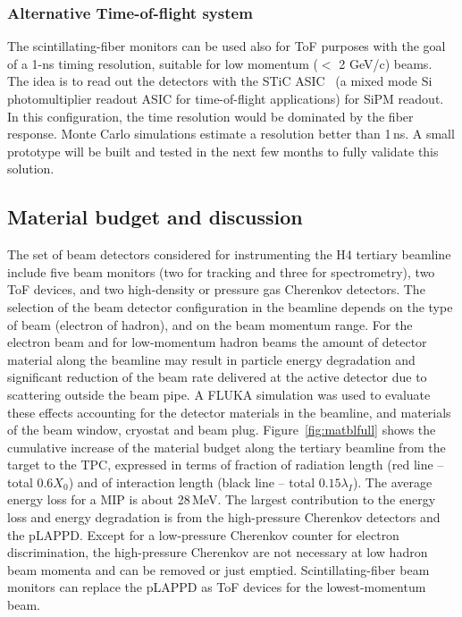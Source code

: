 \subsubsection{Alternative Time-of-flight system}
The  scintillating-fiber monitors can be used also for ToF purposes with the goal of a 1-ns timing resolution, suitable for low momentum ($<$ 2 GeV/c) beams. 
The idea is to read out the detectors with the STiC ASIC~\cite{STIC} (a mixed mode Si photomultiplier readout ASIC for time-of-flight applications) for SiPM readout. 
In this configuration, the time resolution would be dominated by the fiber response. Monte Carlo simulations estimate a resolution better than 1\,ns. 
A small prototype will be built and tested in the next few months to fully validate this solution.

\subsection{Material budget and discussion}
\label{beam-material-budget}
The set of beam detectors considered for instrumenting the H4 tertiary beamline include
 five beam monitors (two for tracking and three for spectrometry), two ToF devices, and two high-density or pressure gas Cherenkov detectors. The selection of the beam detector configuration in the beamline depends on the type of beam (electron of hadron), and on the beam momentum range. For the electron beam and for low-momentum hadron beams the amount of detector material along the beamline may result in particle energy degradation and significant reduction of the beam rate delivered at the active detector due to scattering outside the beam pipe. A FLUKA\cite{Ferrari:2005zk,Fluka15} 
 simulation was used to evaluate these effects accounting for the 
 detector materials in the beamline, and materials of the beam window, cryostat and beam plug. Figure~\ref{fig:matblfull} shows the cumulative increase of the material budget along the tertiary  
beamline from the target to the TPC, expressed in terms of fraction of radiation length (red line -- total  $0.6X_0$) and of interaction length (black line -- total  $0.15 \lambda_I$). The average energy loss for a MIP is about 28\,MeV.
 The largest contribution to the energy loss and energy degradation is from the high-pressure Cherenkov detectors and the pLAPPD. Except for a low-pressure Cherenkov counter for electron discrimination, the high-pressure Cherenkov are not necessary at low hadron beam momenta  and can be removed or just emptied.  Scintillating-fiber beam monitors can replace the pLAPPD as ToF devices for the lowest-momentum beam. 

